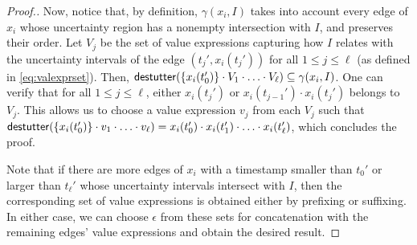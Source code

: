 \begin{proof}[\normalsize Proof.]
	Now, notice that, by definition, $\gamma(x_i, I)$ takes into account every edge of $x_i$ whose uncertainty region has a nonempty intersection with $I$, and preserves their order.
	Let $V_j$ be the set of value expressions capturing how $I$ relates with the uncertainty intervals of the edge $(t_j', x_i(t_j'))$ for all $1 \leq j \leq \ell$ (as defined in \cref{eq:valexprset}).
	Then, $\mathsf{destutter}(\{x_i(t_0')\} \cdot V_1 \cdot \ldots \cdot V_\ell) \subseteq \gamma(x_i, I)$.
	One can verify that for all $1 \leq j \leq \ell$, either $x_i(t_j')$ or $x_i(t_{j-1}') \cdot x_i(t_j')$ belongs to $V_j$.
	This allows us to choose a value expression $v_j$ from each $V_j$ such that $\mathsf{destutter}(\{x_i(t_0')\} \cdot v_1 \cdot \ldots \cdot v_\ell) = x_i(t_0') \cdot x_i(t_1') \cdot \ldots \cdot x_i(t_\ell')$, which concludes the proof. 
	
	Note that if there are more edges of $x_i$ with a timestamp smaller than $t_0'$ or larger than $t_\ell'$ whose uncertainty intervals intersect with $I$, then the corresponding set of value expressions is obtained either by prefixing or suffixing.
	In either case, we can choose $\epsilon$ from these sets for concatenation with the remaining edges' value expressions and obtain the desired result.
\end{proof}
